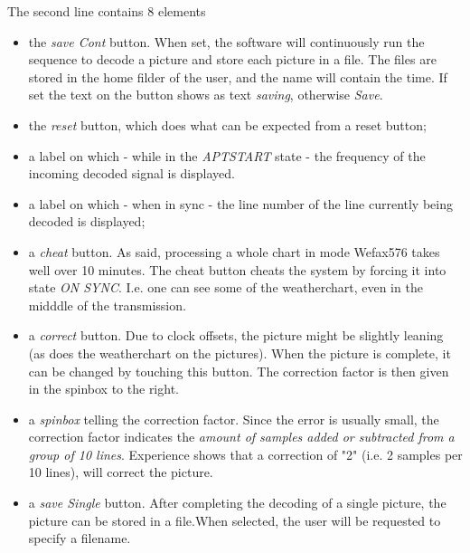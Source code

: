 \documentclass[11pt]{article}
\begin{document}
The second line contains 8 elements
\begin{itemize}
\item the {\em save Cont} button. When set, the software will continuously
run the sequence to decode a picture and store each picture in a file.
The files are stored in the home filder of the user, and the name
will contain the time.
If set the text on the button shows as text {\em saving}, otherwise {\em Save}.
\item the {\em reset} button, which does what
can be expected from a reset button;
\item a label on which - while in the {\em APTSTART} state - the frequency
of the incoming decoded signal is displayed.
\item a label on which - when in sync - the line number
of the line currently being decoded is displayed;
\item a {\em cheat} button. As said, processing a whole chart in mode Wefax576
takes well over 10 minutes. The cheat button cheats the system by forcing
it into state {\em ON SYNC}. I.e. one can see some of the weatherchart,
even in the midddle of the transmission.
\item a {\em correct} button. Due to clock offsets,
the picture might be slightly leaning (as does the weatherchart on
the pictures).
When the picture is complete, it can be changed by touching this button.
The correction factor is then given in the spinbox to the right.
\item a {\em spinbox} telling the correction factor. Since the error is usually
small, the correction factor indicates the {\em amount of samples added
or subtracted from a group of 10 lines}. Experience shows that a correction of
"2" (i.e. 2 samples per 10 lines), will correct the picture.
\item a {\em save Single} button. After completing the decoding of a single
picture, the picture can be stored in a file.When selected, the
user will be requested to specify a filename.
\end{itemize}
\end{document}
